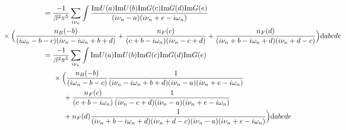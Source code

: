 \documentclass[12pt,a4paper]{scrartcl}
\numberwithin{equation}{section}
\begin{document}
\begin{align}
 &= \frac{-1}{\beta^2\pi^5}\sum_{i\nu_n} 
       \int \frac{ \mathrm{Im}U(a)\mathrm{Im}U(b)\mathrm{Im}G(c)\mathrm{Im}G(d)\mathrm{Im}G(e) }
                 { (i\nu_n-a)(i\nu_n+e-i\omega_n) } \nonumber \\
&\hspace*{-2cm}  \times\Big( 
                    \frac{n_B(-b)}{(i\omega_n-b-c)(i\nu_n-i\omega_n+b+d)}
                   +\frac{n_F(c)}{(c+b-i\omega_n)(i\nu_n-c+d)} 
                   +\frac{n_F(d)}{(i\nu_n+b-i\omega_n+d)(i\nu_n+d-c)}
                 \Big)\mathrm{d}abcde \\
%
 &= \frac{-1}{\beta^2\pi^5}\sum_{i\nu_n} 
       \int \mathrm{Im}U(a)\mathrm{Im}U(b)\mathrm{Im}G(c)\mathrm{Im}G(d)\mathrm{Im}G(e) \nonumber \\
&\hspace*{0.5cm}  \times\Big( 
                    \frac{n_B(-b)}{(i\omega_n-b-c)}
                    \frac{1}{(i\nu_n-i\omega_n+b+d)(i\nu_n-a)(i\nu_n+e-i\omega_n)}\nonumber \\
&\hspace*{1cm} 
                   +\frac{n_F(c)}{(c+b-i\omega_n)} 
                   \frac{1}{(i\nu_n-c+d)(i\nu_n-a)(i\nu_n+e-i\omega_n)}\nonumber \\
&\hspace*{1cm} 
                   +n_F(d)
                   \frac{1}{(i\nu_n+b-i\omega_n+d)(i\nu_n+d-c)(i\nu_n-a)(i\nu_n+e-i\omega_n)}
                 \Big)\mathrm{d}abcde
\end{align}



\end{document}
